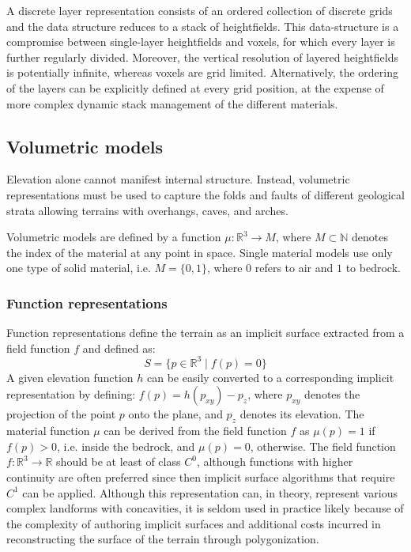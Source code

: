 \documentclass{article}
\begin{document}
A discrete layer representation consists of an ordered collection of discrete grids and the data structure reduces to a stack of heightfields. This data-structure is a compromise between single-layer heightfields and voxels, for which every layer is further regularly divided. Moreover, the vertical resolution of layered heightfields is potentially infinite, whereas voxels are grid limited. Alternatively, the ordering of the layers can be explicitly defined at every grid position, at the expense of more complex dynamic stack management of the different materials.

\subsection{Volumetric models}

Elevation alone cannot manifest internal structure. Instead, volumetric representations must be used to capture the folds and faults of different geological strata allowing terrains with overhangs, caves, and arches.

Volumetric models are defined by a function $\mu : \mathbb{R}^3 \to M$, where $M \subset \mathbb{N}$ denotes the index of the material at any point in space. Single material models use only one type of solid material, i.e. $M = \{0,1\}$, where $0$ refers to air and $1$ to bedrock.

\subsubsection{Function representations}

Function representations define the terrain as an implicit surface extracted from a field function $f$ and defined as:
\[
S = \{p \in \mathbb{R}^3 \mid f(p) = 0\}
\]
A given elevation function $h$ can be easily converted to a corresponding implicit representation by defining: $f(p) = h(p_{xy}) - p_z$, where $p_{xy}$ denotes the projection of the point $p$ onto the plane, and $p_z$ denotes its elevation. The material function $\mu$ can be derived from the field function $f$ as $\mu(p) = 1$ if $f(p) > 0$, i.e. inside the bedrock, and $\mu(p) = 0$, otherwise. The field function $f : \mathbb{R}^3 \to \mathbb{R}$ should be at least of class $C^0$, although functions with higher continuity are often preferred since then implicit surface algorithms that require $C^1$ can be applied. Although this representation can, in theory, represent various complex landforms with concavities, it is seldom used in practice likely because of the complexity of authoring implicit surfaces and additional costs incurred in reconstructing the surface of the terrain through polygonization.
\end{document}
